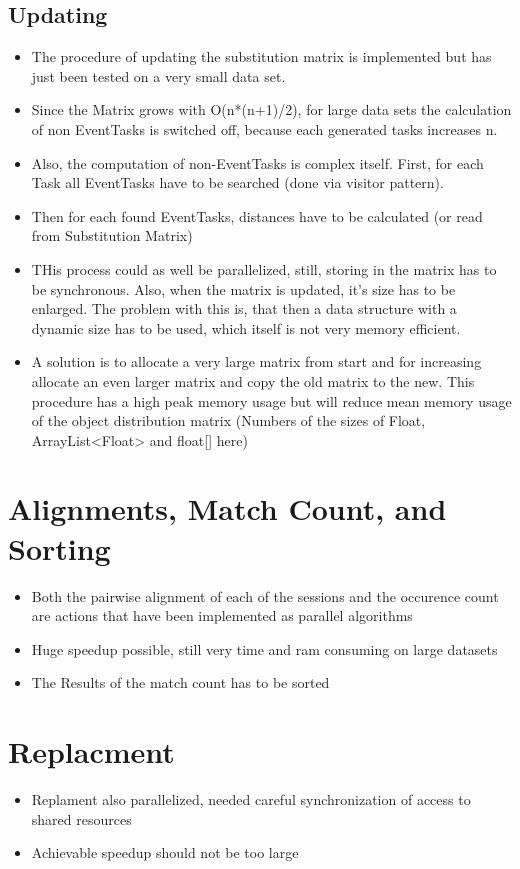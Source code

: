 \subsection{Updating}
\begin{itemize}
	\item The procedure of updating the substitution matrix is implemented but has just been tested on a very small data set. 
	\item Since the Matrix grows with O(n*(n+1)/2), for large data sets the calculation of non EventTasks is switched off, because each generated tasks increases n.
	\item Also, the computation of non-EventTasks is complex itself. First, for each Task all EventTasks have to be searched (done via visitor pattern). 
	\item Then for each found EventTasks, distances have to be calculated (or read from Substitution Matrix)
	\item THis process could as well be parallelized, still, storing in the matrix has to be synchronous. Also, when the matrix is updated, it's size has to be enlarged. The problem with this is, that then a data structure with a dynamic size has to be used, which itself is not very memory efficient. 
	\item A solution is to allocate a very large matrix from start and for increasing allocate an even larger matrix and copy the old matrix to the new. This procedure has a high peak memory usage but will reduce mean memory usage of the object distribution matrix (Numbers of the sizes of Float, ArrayList<Float> and float[] here)
\end{itemize}

\section{Alignments, Match Count, and Sorting}
\begin{itemize}
	\item Both the pairwise alignment of each of the sessions and the occurence count are actions that have been implemented as parallel algorithms
	\item Huge speedup possible, still very time and ram consuming on large datasets
	\item The Results of the match count has to be sorted
\end{itemize}

\section{Replacment}
\begin{itemize}
	\item Replament also parallelized, needed careful synchronization of access to shared resources
	\item Achievable speedup should not be too large
\end{itemize}


